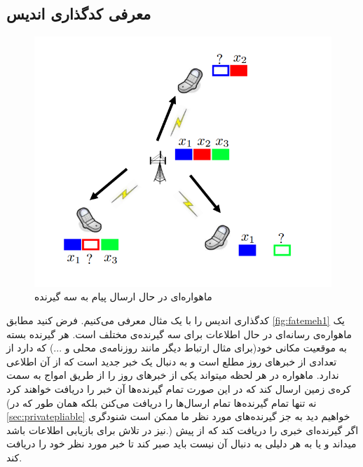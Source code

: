 \subsection{
	معرفی کدگذاری اندیس
	}
	\begin{figure}
		\centering
		\includegraphics[width=1\linewidth]{figs/chapter1/fatemeh1}
		\caption[
					ماهواره‌ای در حال ارسال پیام به سه گیرنده
		]{
			ماهواره‌ای در حال ارسال پیام به سه گیرنده
			\cite{fatemehbook}
		}
		\label{fig:fatemeh1}
	\end{figure}
کدگذاری اندیس را با یک مثال معرفی می‌کنیم. فرض کنید مطابق 
\autoref{fig:fatemeh1}
یک ماهواره‌‌ی رسانه‌ای در حال 
 اطلاعات برای سه گیرنده‌ی مختلف است. 
هر گیرنده بسته به موقعیت مکانی خود(برای مثال ارتباط دیگر مانند روزنامه‌ی محلی و ...) که دارد از تعدادی از خبرهای روز مطلع است و به دنبال یک خبر جدید است که از آن اطلاعی ندارد. ماهواره در هر لحظه میتواند یکی از خبرهای روز را از طریق امواج به سمت کره‌ی زمین ارسال کند که در این صورت تمام گیرنده‌ها آن خبر را دریافت خواهند کرد (نه تنها تمام گیرنده‌ها تمام ارسال‌ها را دریافت می‌کنن بلکه همان طور که در
\autoref{sec:privatepliable}
خواهیم دید به جز گیرنده‌های مورد نظر ما ممکن است شنودگری نیز در تلاش برای بازیابی اطلاعات باشد.) اگر گیرنده‌ای خبری را دریافت کند که از پیش میداند و یا به هر دلیلی به دنبال آن نیست باید صبر کند تا خبر مورد نظر خود را دریافت کند.


